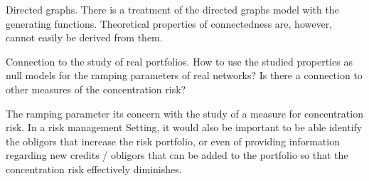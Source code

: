 Directed graphs.
There is a treatment of the directed graphs model with the generating functions.
Theoretical properties of connectedness are, however, cannot easily be derived from them.



Connection to the study of real portfolios.
How to use the studied properties as null models for the ramping parameters of real networks?
Is there a connection to other measures of the concentration risk?


The ramping parameter its concern with the study of a measure for concentration risk.
In a risk management Setting, it would also be important to be able identify the obligors that increase the risk portfolio, or even of providing information regarding new credits / obligors that can be added to the portfolio so that the concentration risk effectively diminishes.



